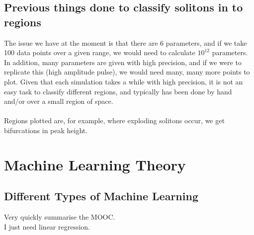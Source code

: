 \documentclass[a4paper,12pt]{report}
\begin{document}
\section{Previous things done to classify solitons in to regions}
The issue we have at the moment is that there are 6 parameters, and if we take 100 data points over a given range, we would need to calculate $10^12$ parameters. In addition, many parameters are given with high precision, and if we were to replicate this (high amplitude pulse), we would need many, many more points to plot. Given that each simulation takes a while with high precision, it is not an easy task to classify different regions, and typically has been done by hand and/or over a small region of space.
\\\\
Regions plotted are, for example, where exploding solitons occur, we get bifurcations in peak height. 









\chapter{Machine Learning Theory}
\section{Different Types of Machine Learning}
Very quickly summarise the MOOC.\\
I just need linear regression.
\end{document}
